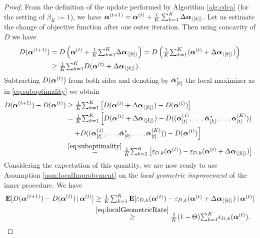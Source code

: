 \documentclass{article} %
\begin{document}
\begin{proof}
From the definition of the update performed by Algorithm \ref{alg:cdca} (for the setting of $\beta_K:=1$), we have
$\bm{\alpha}^{(t+1)}
  =
  \bm{\alpha}^{(t)}
  + \frac1K \sum_{k=1}^K   \Delta \bm{\alpha} _{\langle[k]\rangle}$.
Let us estimate the change of objective function after one outer iteration.
  Then using concavity of $D$ we have
\begin{align*}
D(\bm{\alpha}^{(t+1)})
 &=
 D\left(\bm{\alpha}^{(t)}
  + \tfrac1K \textstyle{\sum}_{k=1}^K 
      \Delta \bm{\alpha}_{\langle[k]\rangle}
     \right)
  =
  D\left(\tfrac1K \textstyle{\sum}_{k=1}^K (
     \bm{\alpha}^{(t)} + \Delta \bm{\alpha}_{\langle[k]\rangle} )
        \right)
\\&\geq
 \tfrac1K \textstyle{\sum}_{k=1}^K D(
    \bm{\alpha}^{(t)} + \Delta \bm{\alpha}_{\langle[k]\rangle} ).
\end{align*}
Subtracting $D(\bm{\alpha}^{(t)})$ from both sides and denoting by
$\hat {\bm{\alpha}}^*_{[k]}$ the local maximizer as in \eqref{eq:suboptimality}
we obtain
\begin{align*}
D(\bm{\alpha}^{(t+1)})-D(\bm{\alpha}^{(t)})
 &\geq
 \tfrac1K \textstyle{\sum}_{k=1}^K
 \left[ D(
    \bm{\alpha}^{(t)} + \Delta \bm{\alpha}_{\langle[k]\rangle}
      )
    -D(\bm{\alpha}^{(t)}) \right]
\\
 &=
 \tfrac1K \textstyle{\sum}_{k=1}^K
 \left[ D(
    \bm{\alpha}^{(t)} + \Delta \bm{\alpha}_{\langle[k]\rangle}
      )
      -D((\bm{\alpha}_{[t]}^{(1)},\dots,\hat{\bm{\alpha}}^*_{[k]},\dots,\bm{\alpha}_{[t]}^{(K)})) 
      \right.
      \\ &\quad \left.
      +D((\bm{\alpha}_{[t]}^{(1)},\dots,\hat{\bm{\alpha}}^*_{[k]},\dots,\bm{\alpha}_{[t]}^{(K)})) 
    -D(\bm{\alpha}^{(t)}) \right]
\\
&\overset{\eqref{eq:suboptimality}}{=}
 \tfrac1K \textstyle{\sum}_{k=1}^K
 \left[
 {\varepsilon}_{\hspace{-0.08em}D,k}(\bm{\alpha}^{(t)})
 - {\varepsilon}_{\hspace{-0.08em}D,k}(\bm{\alpha}^{(t)}+   \Delta\bm{\alpha}_{\langle[k]\rangle} )
 \right].
\end{align*}
Considering the expectation of this quantity, we are now ready to use Assumption \ref{asm:localImprobvment} on the \emph{local geometric improvement} of the inner procedure. We have
\begin{align*}
\operatorname*{\mathbf{E}}[D(\bm{\alpha}^{(t+1)})-D(\bm{\alpha}^{(t)})\,|\,\bm{\alpha}^{(t)}]
 &\geq
 \tfrac1K \textstyle{\sum}_{k=1}^K
 \operatorname*{\mathbf{E}}[
  {\varepsilon}_{\hspace{-0.08em}D,k}(\bm{\alpha}^{(t)})
 - {\varepsilon}_{\hspace{-0.08em}D,k}(\bm{\alpha}^{(t)}+   \Delta\bm{\alpha}_{\langle[k]\rangle} )
 \,|\, \bm{\alpha}^{(t)} ]
\\
&\overset{\eqref{eq:localGeometricRate}}{\geq}
 \tfrac1K  (1-\Theta) 
 \textstyle{\sum}_{k=1}^K
  {\varepsilon}_{\hspace{-0.08em}D,k}(\bm{\alpha}^{(t)}) .
\end{align*}

\end{proof}
\end{document}
